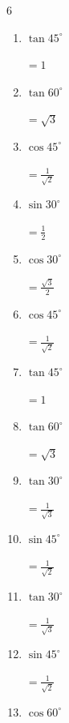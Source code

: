 \begin{multicols}{6}
\begin{enumerate}
        $\displaystyle =\frac{1}{2}$

  \item $\displaystyle \tan{45^\circ}$

        $\displaystyle =1$

  \item $\displaystyle \tan{60^\circ}$

        $\displaystyle =\sqrt{3}$

  \item $\displaystyle \cos{45^\circ}$

        $\displaystyle =\frac{1}{\sqrt{2}}$

  \item $\displaystyle \sin{30^\circ}$

        $\displaystyle =\frac{1}{2}$

  \item $\displaystyle \cos{30^\circ}$

        $\displaystyle =\frac{\sqrt{3}}{2}$

  \item $\displaystyle \cos{45^\circ}$

        $\displaystyle =\frac{1}{\sqrt{2}}$

  \item $\displaystyle \tan{45^\circ}$

        $\displaystyle =1$

  \item $\displaystyle \tan{60^\circ}$

        $\displaystyle =\sqrt{3}$

\columnbreak %

  \item $\displaystyle \tan{30^\circ}$

        $\displaystyle =\frac{1}{\sqrt{3}}$

  \item $\displaystyle \sin{45^\circ}$

        $\displaystyle =\frac{1}{\sqrt{2}}$

  \item $\displaystyle \tan{30^\circ}$

        $\displaystyle =\frac{1}{\sqrt{3}}$

  \item $\displaystyle \sin{45^\circ}$

        $\displaystyle =\frac{1}{\sqrt{2}}$

  \item $\displaystyle \cos{60^\circ}$


\end{enumerate}
\end{multicols}
